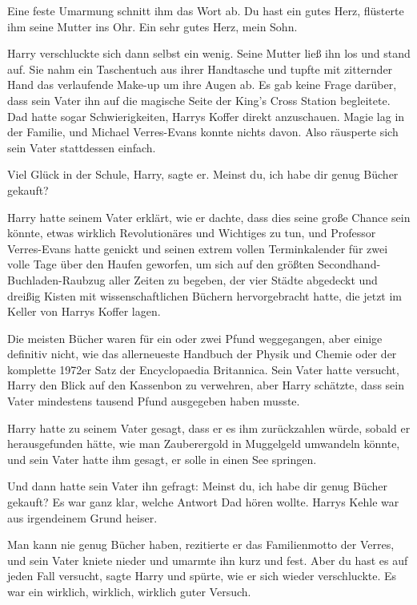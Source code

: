 Eine feste Umarmung schnitt ihm das Wort ab. \glqq{}Du hast ein gutes
Herz\grqq{}, flüsterte ihm seine Mutter ins Ohr. \glqq{}Ein sehr gutes Herz,
mein Sohn.\grqq{}

Harry verschluckte sich dann selbst ein wenig. Seine Mutter ließ ihn los und
stand auf. Sie nahm ein Taschentuch aus ihrer Handtasche und tupfte mit
zitternder Hand das verlaufende Make-up um ihre Augen ab. Es gab keine Frage
darüber, dass sein Vater ihn auf die magische Seite der King's Cross Station
begleitete. Dad hatte sogar Schwierigkeiten, Harrys Koffer direkt anzuschauen.
Magie lag in der Familie, und Michael Verres-Evans konnte nichts davon. Also
räusperte sich sein Vater stattdessen einfach.

\glqq{}Viel Glück in der Schule, Harry\grqq{}, sagte er. \glqq{}Meinst du, ich
habe dir genug Bücher gekauft?\grqq{}

Harry hatte seinem Vater erklärt, wie er dachte, dass dies seine große Chance
sein könnte, etwas wirklich Revolutionäres und Wichtiges zu tun, und Professor
Verres-Evans hatte genickt und seinen extrem vollen Terminkalender für zwei
volle Tage über den Haufen geworfen, um sich auf den größten
Secondhand-Buchladen-Raubzug aller Zeiten zu begeben, der vier Städte abgedeckt
und dreißig Kisten mit wissenschaftlichen Büchern hervorgebracht hatte, die
jetzt im Keller von Harrys Koffer lagen.

Die meisten Bücher waren für ein oder zwei Pfund weggegangen, aber einige
definitiv nicht, wie das allerneueste \glqq{}Handbuch der Physik und
Chemie\grqq{} oder der komplette 1972er Satz der \glqq{}Encyclopaedia
Britannica\grqq{}. Sein Vater hatte versucht, Harry den Blick auf den Kassenbon
zu verwehren, aber Harry schätzte, dass sein Vater mindestens tausend Pfund
ausgegeben haben musste.

Harry hatte zu seinem Vater gesagt, dass er es ihm zurückzahlen würde, sobald er
herausgefunden hätte, wie man Zauberergold in Muggelgeld umwandeln könnte, und
sein Vater hatte ihm gesagt, er solle in einen See springen.

Und dann hatte sein Vater ihn gefragt: Meinst du, ich habe dir genug Bücher
gekauft? Es war ganz klar, welche Antwort Dad hören wollte. Harrys Kehle war aus
irgendeinem Grund heiser.

\glqq{}Man kann nie genug Bücher haben\grqq{}, rezitierte er das Familienmotto
der Verres, und sein Vater kniete nieder und umarmte ihn kurz und fest. \glqq{}
Aber du hast es auf jeden Fall versucht\grqq{}, sagte Harry und spürte, wie er
sich wieder verschluckte. \glqq{}Es war ein wirklich, wirklich, wirklich guter
Versuch.\grqq{}

